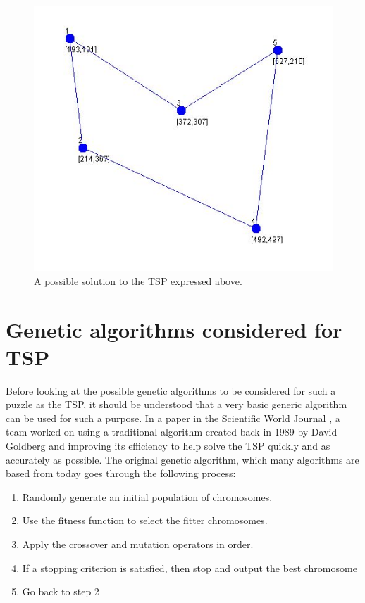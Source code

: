 \documentclass[article]{IEEEtran}
\begin{document}
\begin{figure}
\centering
  \includegraphics[width=.8\linewidth]{images/solution}
  \caption{A possible solution to the TSP expressed above.}
  \label{fig:2}
\end{figure}

\section{Genetic algorithms considered for TSP}
Before looking at the possible genetic algorithms to be considered for such a puzzle as the TSP, it should be understood that a very basic generic algorithm can be used for such a purpose. In a paper in the Scientific World Journal \cite{4}, a team worked on using a traditional algorithm created back in 1989 by David Goldberg \cite{5} and improving its efficiency to help solve the TSP quickly and as accurately as possible. The original genetic algorithm, which many algorithms are based from today goes through the following process:
\begin{enumerate}
\item Randomly generate an initial population of chromosomes.
\item Use the fitness function to select the fitter chromosomes.
\item Apply the crossover and mutation operators in order. 
\item If a stopping criterion is satisfied, then stop and output the best chromosome
\item Go back to step 2
\end{enumerate}
\end{document}
